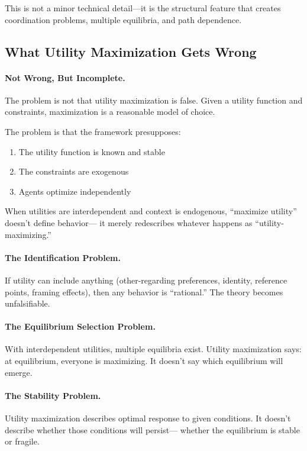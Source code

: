 \documentclass[12pt,a4paper]{article}
\begin{document}
This is not a minor technical detail---it is the structural feature
that creates coordination problems, multiple equilibria, and path dependence.

\subsection{What Utility Maximization Gets Wrong}

\paragraph{Not Wrong, But Incomplete.}
The problem is not that utility maximization is false.
Given a utility function and constraints, maximization is a reasonable model of choice.

The problem is that the framework presupposes:
\begin{enumerate}
  \item The utility function is known and stable
  \item The constraints are exogenous
  \item Agents optimize independently
\end{enumerate}

When utilities are interdependent and context is endogenous,
``maximize utility'' doesn't define behavior---
it merely redescribes whatever happens as ``utility-maximizing.''

\paragraph{The Identification Problem.}
If utility can include anything (other-regarding preferences, identity, 
reference points, framing effects), then any behavior is ``rational.''
The theory becomes unfalsifiable.

\paragraph{The Equilibrium Selection Problem.}
With interdependent utilities, multiple equilibria exist.
Utility maximization says: at equilibrium, everyone is maximizing.
It doesn't say which equilibrium will emerge.

\paragraph{The Stability Problem.}
Utility maximization describes optimal response to given conditions.
It doesn't describe whether those conditions will persist---
whether the equilibrium is stable or fragile.
\end{document}
